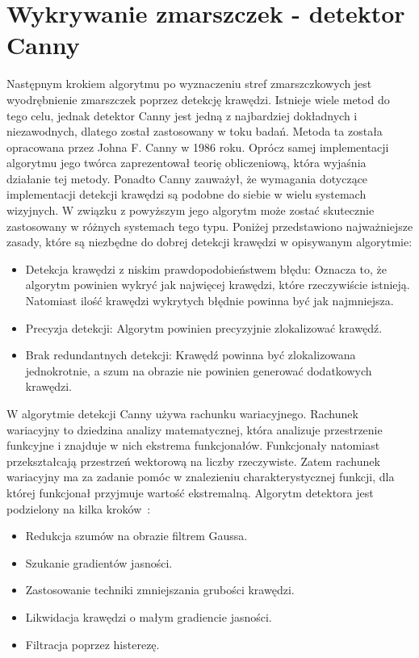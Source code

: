 \documentclass[a4paper,twoside,12pt]{book}
\begin{document}
    \section{Wykrywanie zmarszczek - detektor Canny}\label{sec:wykrywanie-zmarszczek---detektor-canny}
    Następnym krokiem algorytmu po wyznaczeniu stref zmarszczkowych jest wyodrębnienie zmarszczek poprzez detekcję
    krawędzi.
    Istnieje wiele metod do tego celu,
    jednak detektor Canny jest jedną z najbardziej dokładnych i niezawodnych, dlatego został zastosowany w toku badań.
    Metoda ta została opracowana przez Johna F. Canny w 1986 roku.
    Oprócz samej implementacji algorytmu jego twórca zaprezentował teorię obliczeniową,
    która wyjaśnia działanie tej metody. Ponadto Canny zauważył,
    że wymagania dotyczące implementacji detekcji krawędzi są podobne do siebie w wielu systemach wizyjnych.
    W związku z powyższym jego algorytm może zostać skutecznie zastosowany w różnych systemach tego typu.
    Poniżej przedstawiono najważniejsze zasady,
    które są niezbędne do dobrej detekcji krawędzi w opisywanym algorytmie:
    \begin{itemize}
        \item Detekcja krawędzi z niskim prawdopodobieństwem błędu:
        Oznacza to, że algorytm powinien wykryć jak najwięcej krawędzi, które rzeczywiście istnieją.
        Natomiast ilość krawędzi wykrytych błędnie powinna być jak najmniejsza.
        \item Precyzja detekcji: Algorytm powinien precyzyjnie zlokalizować krawędź.
        \item Brak redundantnych detekcji:
        Krawędź powinna być zlokalizowana jednokrotnie,
        a szum na obrazie nie powinien generować dodatkowych krawędzi.
    \end{itemize}
    W algorytmie detekcji Canny używa rachunku wariacyjnego.
    Rachunek wariacyjny to dziedzina analizy matematycznej, która
    analizuje przestrzenie funkcyjne i znajduje w nich ekstrema funkcjonałów.
    Funkcjonały natomiast przekształcają przestrzeń wektorową na liczby rzeczywiste.
    Zatem rachunek wariacyjny ma za zadanie pomóc w znalezieniu charakterystycznej funkcji,
    dla której funkcjonał przyjmuje wartość ekstremalną.
    Algorytm detektora jest podzielony na kilka kroków~\cite{Canny}:
    \begin{itemize}
        \item Redukcja szumów na obrazie filtrem Gaussa.
        \item Szukanie gradientów jasności.
        \item Zastosowanie techniki zmniejszania grubości krawędzi.
        \item Likwidacja krawędzi o małym gradiencie jasności.
        \item Filtracja poprzez histerezę.
    \end{itemize}
\end{document}
